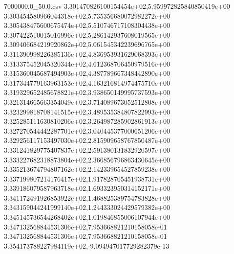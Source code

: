 \begin{filecontents*}{7000000.0_50.0.csv}
3.301470826100154454e+02,5.959972825840850419e+00
3.303454580966044318e+02,5.735356680072982272e+00
3.305438475600675474e+02,5.510746717108304438e+00
3.307422510015016996e+02,5.286142937608019565e+00
3.309406684219920862e+02,5.061545342239696765e+00
3.311390998226385136e+02,4.836953931629068393e+00
3.313375452045320344e+02,4.612368706450979516e+00
3.315360045687494903e+02,4.387789667348442890e+00
3.317344779163963153e+02,4.163216814974475710e+00
3.319329652485678821e+02,3.938650149995737593e+00
3.321314665663354049e+02,3.714089673052512808e+00
3.323299818708141515e+02,3.489535384807822993e+00
3.325285111630810206e+02,3.264987285902861913e+00
3.327270544442287701e+02,3.040445377000651206e+00
3.329256117153497030e+02,2.815909658767850487e+00
3.331241829775407837e+02,2.591380131832920597e+00
3.333227682318873804e+02,2.366856796863430645e+00
3.335213674794807162e+02,2.142339654527859238e+00
3.337199807214176417e+02,1.917828705451938731e+00
3.339186079587963718e+02,1.693323950314152171e+00
3.341172491926853922e+02,1.468825389754783828e+00
3.343159044241999140e+02,1.244333024429579382e+00
3.345145736544268402e+02,1.019846855006107944e+00
3.347132568844531306e+02,7.953668821210158058e-01
3.347132568844531306e+02,7.953668821210158058e-01
3.354173788227984119e+02,-9.094947017729282379e-13
\end{filecontents*}

